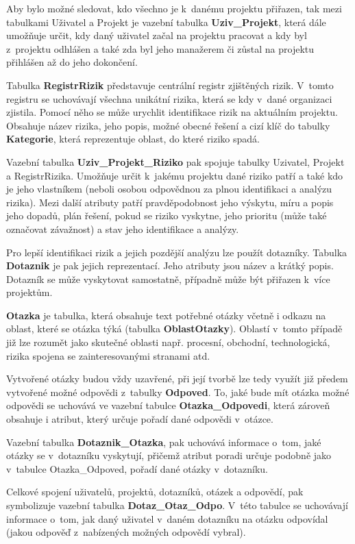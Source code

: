 Aby bylo možné sledovat, kdo všechno je k~danému projektu přiřazen, tak mezi tabulkami Uživatel a Projekt je vazební tabulka \textbf{Uziv\_Projekt}, která dále umožňuje určit, kdy daný uživatel začal na projektu pracovat a kdy byl z~projektu odhlášen a také zda byl jeho manažerem či zůstal na projektu přihlášen až do jeho dokončení.

Tabulka \textbf{RegistrRizik} představuje centrální registr zjištěných rizik. V~tomto registru se uchovávají všechna unikátní rizika, která se kdy v~dané organizaci zjistila. Pomocí něho se může urychlit identifikace rizik na aktuálním projektu. Obsahuje název  rizika, jeho popis, možné obecné řešení a cizí klíč do tabulky \textbf{Kategorie}, která reprezentuje oblast, do které riziko spadá.

Vazební tabulka \textbf{Uziv\_Projekt\_Riziko} pak spojuje tabulky Uzivatel, Projekt a RegistrRizika. Umožňuje určit k~jakému projektu dané riziko patří a také kdo je jeho vlastníkem (neboli osobou odpovědnou za plnou identifikaci a analýzu rizika). Mezi další atributy patří pravděpodobnost jeho výskytu, míru a popis jeho dopadů, plán řešení, pokud se riziko vyskytne, jeho prioritu (může také označovat závažnost) a stav jeho identifikace a analýzy.

Pro lepší identifikaci rizik a jejich pozdější analýzu lze použít dotazníky. Tabulka \textbf{Dotaznik} je pak jejich reprezentací. Jeho atributy jsou název a krátký popis. Dotazník se může vyskytovat samostatně, případně může být přiřazen k~více projektům.

\textbf{Otazka} je tabulka, která obsahuje text potřebné otázky včetně i odkazu na oblast, které se otázka týká (tabulka \textbf{OblastOtazky}). Oblastí v~tomto případě již lze rozumět jako skutečné oblasti např. procesní, obchodní, technologická, rizika spojena se zainteresovanými stranami atd.

Vytvořené otázky budou vždy uzavřené, při její tvorbě lze tedy využít již předem vytvořené možné odpovědi z~tabulky \textbf{Odpoved}. To, jaké bude mít otázka možné odpovědi se uchovává ve vazební tabulce \textbf{Otazka\_Odpovedi}, která zároveň obsahuje i atribut, který určuje pořadí dané odpovědi v~otázce.

Vazební tabulka \textbf{Dotaznik\_Otazka}, pak uchovává informace o~tom, jaké otázky se v~dotazníku vyskytují, přičemž atribut poradi určuje podobně jako v~tabulce Otazka\_Odpo\-ved, pořadí dané otázky v~dotazníku. 

Celkové spojení uživatelů, projektů, dotazníků, otázek a odpovědí, pak symbolizuje vazební tabulka \textbf{Dotaz\_Otaz\_Odpo}. V~této tabulce se uchovávají informace o~tom, jak daný uživatel v~daném dotazníku na otázku odpovídal (jakou odpověď z~nabízených možných odpovědí vybral).


